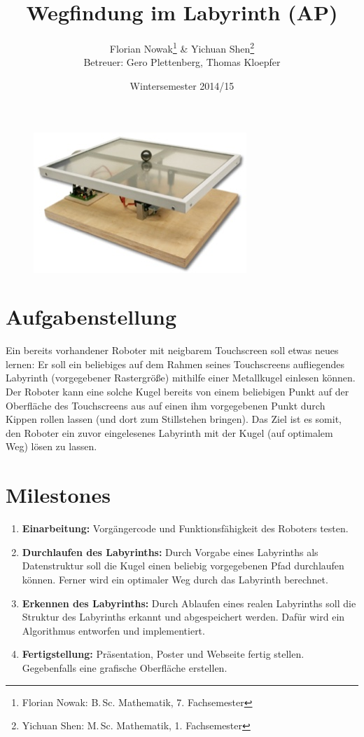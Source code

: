 \documentclass[ngerman]{scrartcl}
\title{Wegfindung im Labyrinth (AP)}
\author{
    Florian Nowak\footnote{Florian Nowak: B.\,Sc. Mathematik, 7. Fachsemester}\; \& Yichuan Shen\footnote{Yichuan Shen: M.\,Sc. Mathematik, 1. Fachsemester}\\
    Betreuer: Gero Plettenberg, Thomas Kloepfer
}
\date{Wintersemester 2014/15}
\begin{document}

\maketitle

\begin{figure}[h]
    \centering
    \includegraphics[scale=.5]{platzhalter}
\end{figure}

\section*{Aufgabenstellung}

Ein bereits vorhandener Roboter mit neigbarem Touchscreen soll etwas neues lernen: Er soll ein beliebiges auf dem Rahmen seines Touchscreens aufliegendes Labyrinth (vorgegebener Rastergröße) mithilfe einer Metallkugel einlesen können. Der Roboter kann eine solche Kugel bereits von einem beliebigen Punkt auf der Oberfläche des Touchscreens aus auf einen ihm vorgegebenen Punkt durch Kippen rollen lassen (und dort zum Stillstehen bringen). Das Ziel ist es somit, den Roboter ein zuvor eingelesenes Labyrinth mit der Kugel (auf optimalem Weg) lösen zu lassen.

\section*{Milestones}
\begin{enumerate}
    \item \textbf{Einarbeitung:} Vorgängercode und Funktionsfähigkeit des Roboters testen.
    \item \textbf{Durchlaufen des Labyrinths:} Durch Vorgabe eines Labyrinths als Datenstruktur soll die Kugel einen beliebig vorgegebenen Pfad durchlaufen können. Ferner wird ein optimaler Weg durch das Labyrinth berechnet.
    \item \textbf{Erkennen des Labyrinths:} Durch Ablaufen eines realen Labyrinths soll die Struktur des Labyrinths erkannt und abgespeichert werden. Dafür wird ein Algorithmus entworfen und implementiert.
    \item \textbf{Fertigstellung:} Präsentation, Poster und Webseite fertig stellen. Gegebenfalls eine grafische Oberfläche erstellen.
\end{enumerate}
\end{document}
